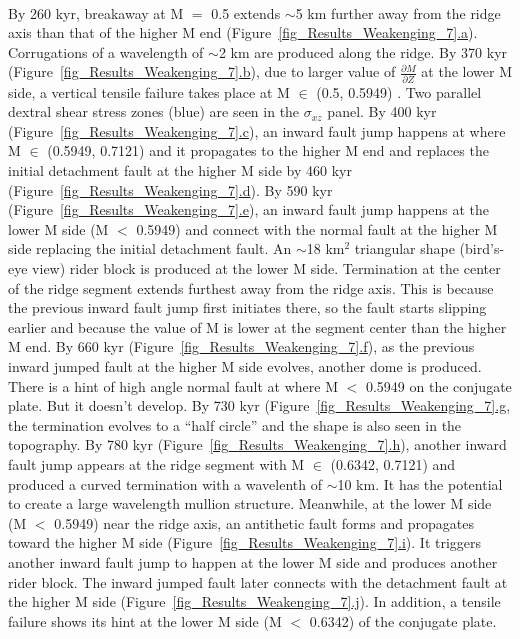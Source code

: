~\\
By 260 kyr, breakaway at M $=$ 0.5 extends $\sim$5 km further away from the ridge axis than that of the higher M end (Figure~\hyperref[fig_Results_Weakenging_7]{\ref{fig_Results_Weakenging_7}.a}). Corrugations of a wavelength of $\sim$2 km  are produced along the ridge. By 370 kyr (Figure~\hyperref[fig_Results_Weakenging_7]{\ref{fig_Results_Weakenging_7}.b}), due to larger value of $\frac{\partial M}{\partial Z}$ at the lower M side, a vertical tensile failure takes place at M $\in$ (0.5, 0.5949) . Two parallel dextral shear stress zones (blue) are seen in the $\sigma_{xz}$ panel. By 400 kyr (Figure~\hyperref[fig_Results_Weakenging_7]{\ref{fig_Results_Weakenging_7}.c}), an inward fault jump happens at where M $\in$ (0.5949, 0.7121) and it propagates to the higher M end and replaces the initial detachment fault at the higher M side by 460 kyr (Figure~\hyperref[fig_Results_Weakenging_7]{\ref{fig_Results_Weakenging_7}.d}). By 590 kyr (Figure~\hyperref[fig_Results_Weakenging_7]{\ref{fig_Results_Weakenging_7}.e}), an inward fault jump happens at the lower M side (M $<$ 0.5949) and connect with the normal fault at the higher M side replacing the initial detachment fault. An $\sim$18 km$^{2}$ triangular shape (bird's-eye view) rider block is produced at the lower M side. Termination at the center of the ridge segment extends furthest away from the ridge axis. This is because the previous inward fault jump first initiates there, so the fault starts slipping earlier and because the value of M is lower at the segment center than the higher M end. By 660 kyr (Figure~\hyperref[fig_Results_Weakenging_7]{\ref{fig_Results_Weakenging_7}.f}), as the previous inward jumped fault at the higher M side evolves, another dome is produced. There is a hint of high angle normal fault at where M $<$ 0.5949 on the conjugate plate. But it doesn't develop. By 730 kyr (Figure~\hyperref[fig_Results_Weakenging_7]{\ref{fig_Results_Weakenging_7}.g}, the termination evolves to a ``half circle'' and the shape is also seen in the topography. By 780 kyr (Figure~\hyperref[fig_Results_Weakenging_7]{\ref{fig_Results_Weakenging_7}.h}), another inward fault jump appears at the ridge segment with M $\in$ (0.6342, 0.7121) and produced a curved termination with a wavelenth of $\sim$10 km. It has the potential to create a large wavelength mullion structure. Meanwhile, at the lower M side (M $<$ 0.5949) near the ridge axis, an antithetic fault forms and propagates toward the higher M side (Figure~\hyperref[fig_Results_Weakenging_7]{\ref{fig_Results_Weakenging_7}.i}). It triggers another inward fault jump to happen at the lower M side and produces another rider block. The inward jumped fault later connects with the detachment fault at the higher M side (Figure~\hyperref[fig_Results_Weakenging_7]{\ref{fig_Results_Weakenging_7}.j}). In addition, a tensile failure shows its hint at the lower M side (M $<$ 0.6342) of the conjugate plate.

